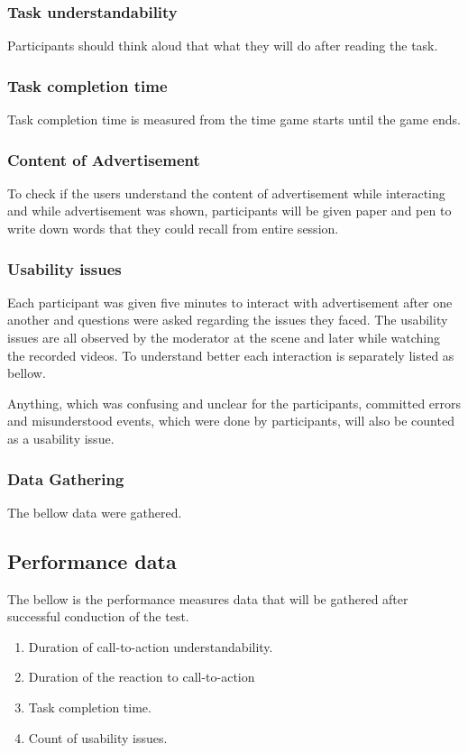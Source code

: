 \subsubsection{Task understandability}
Participants should think aloud that what they will do after reading the task. 

\subsubsection{Task completion time}
Task completion time is measured from the time game starts until the game ends. 

\subsubsection{Content of Advertisement}
To check if the users understand the content of advertisement while interacting and while advertisement was shown, participants will be given paper and pen to write down words that they could recall from entire session.

\subsubsection{Usability issues}
Each participant was given five minutes to interact with advertisement after one another and questions were asked regarding the issues they faced.
The usability issues are all observed by the moderator at the scene and later while watching the recorded videos. To understand better each interaction is separately listed as bellow.

Anything, which was confusing and unclear for the participants, committed errors and misunderstood events, which were done by participants, will also be counted as a usability issue. 

\subsubsection{Data Gathering }
The bellow data were gathered.

\subsection{Performance data}
The bellow is the performance measures data that will be gathered after successful conduction of the test.
\begin{enumerate}
\item	Duration of call-to-action understandability.
\item	Duration of the reaction to call-to-action
\item	Task completion time.
\item	Count of usability issues.
\end{enumerate}
 
